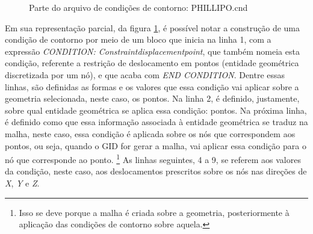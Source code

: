 \begin{figure}
    
    \caption{Parte do arquivo de condições de contorno: PHILLIPO.cnd}
    \label{fig:PHILLIPO.cnd}
\end{figure}

Em sua representação parcial, da figura \ref{fig:PHILLIPO.cnd}, é possível notar a construção de uma condição de contorno por meio de um bloco que inicia na linha 1, com a expressão \emph{CONDITION: Constraint\underline{}displacement\underline{}point}, que também nomeia esta condição, referente a restrição de deslocamento em pontos (entidade geométrica discretizada por um nó), e que acaba com \emph{END CONDITION}. Dentre essas linhas, são definidas as formas e os valores que essa condição vai aplicar sobre a geometria selecionada, neste caso, os pontos. Na linha 2, é definido, justamente, sobre qual entidade geométrica se aplica essa condição: pontos. Na próxima linha, é definido como que essa informação associada à entidade geométrica se traduz na malha, neste caso, essa condição é aplicada sobre os nós que correspondem aos pontos, ou seja, quando o GID for gerar a malha, vai aplicar essa condição para o nó que corresponde ao ponto. \footnote{Isso se deve porque a malha é criada sobre a geometria, posteriormente à aplicação das condições de contorno sobre aquela.} As linhas seguintes, 4 a 9, se referem aos valores da condição, neste caso, aos deslocamentos prescritos sobre os nós nas direções de \emph{X}, \emph{Y} e \emph{Z}. 


